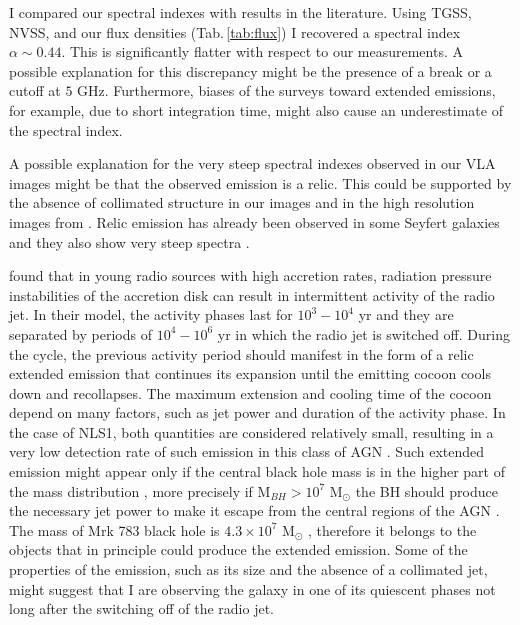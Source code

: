 \documentclass[../main.tex]{subfiles}
\begin{document}
I compared our spectral indexes with results in the literature.
Using TGSS, NVSS, and our flux densities (Tab.\,\ref{tab:flux}) I recovered a spectral index $\alpha\sim 0.44$.
This is significantly flatter with respect to our measurements.
A possible explanation for this discrepancy might be the presence of a break or a cutoff at $5$ GHz.
Furthermore, biases of the surveys toward extended emissions, for example, due to short integration time, might also cause an underestimate of the spectral index.

A possible explanation for the very steep spectral indexes observed in our VLA images might be that the observed emission is a relic.
This could be supported by the absence of collimated structure in our images and in the high resolution images from \citet{Doi13}.
Relic emission has already been observed in some Seyfert galaxies \citep[e.g., NGC 4235,][]{Kharb16} and they also show very steep spectra \citep[e.g.,][]{Jamrozy04,Kharb16}.

\citet{Czerny09} found that in young radio sources with high accretion rates, radiation pressure instabilities of the accretion disk can result in intermittent activity of the radio jet.
In their model, the activity phases last for $10^3-10^4$ yr and they are separated by periods of $10^4-10^6$ yr in which the radio jet is switched off.
During the cycle, the previous activity period should manifest in the form of a relic extended emission that continues its expansion until the emitting cocoon cools down and recollapses.
The maximum extension and cooling time of the cocoon depend on many factors, such as jet power and duration of the activity phase.
In the case of NLS1, both quantities are considered relatively small, resulting in a very low detection rate of such emission in this class of AGN \citep{Czerny09,Foschini15}. 
Such extended emission might appear only if the central black hole mass is in the higher part of the mass distribution \citep[which spans between $10^6$ to $10^8$ M$_{\odot}$, e.g.,][]{Cracco16}, more precisely if M$_{BH}>10^7$ M$_{\odot}$ the BH should produce the necessary jet power to make it escape from the central regions of the AGN \citep{Doi12}.
The mass of Mrk 783 black hole is $4.3\times10^7$ M$_{\odot}$ \citep{Berton15a}, therefore it belongs to the objects that in principle could produce the extended emission.
Some of the properties of the emission, such as its size and the absence of a collimated jet, might suggest that I are observing the galaxy in one of its quiescent phases not long after the switching off of the radio jet.
\end{document}
